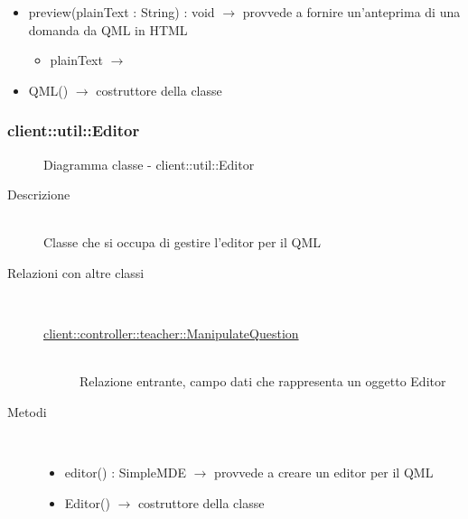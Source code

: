\begin{description}
\begin{itemize}
	\item preview(plainText : String) : void $\rightarrow$ provvede a fornire un'anteprima di una domanda da QML in HTML\begin{itemize}
		\item plainText $\rightarrow$ 
	\end{itemize}
	
	\item QML() $\rightarrow$ costruttore della classe
\end{itemize}

\end{description}

\vspace{0.5cm}
\hypertarget{client::util::Editor}{}
\subsubsection[Editor]{client::util::Editor}
\begin{figure}[H]
	\centering
	\caption{Diagramma classe - client::util::Editor}
\end{figure}\begin{description}
\item[Descrizione] \hfill \\
Classe che si occupa di gestire l'editor per il QML
\item[Relazioni con altre classi] \hfill \\
\vspace{-7mm}
\begin{description}
	\item[\hyperlink{client::controller::teacher::ManipulateQuestion}{client::controller::teacher::ManipulateQuestion}] \hfill \\
	Relazione entrante, campo dati che rappresenta un oggetto Editor
\end{description}

\item[Metodi] \hfill \\
\vspace{-7mm}
\begin{itemize}
	\item editor() : SimpleMDE $\rightarrow$ provvede a creare un editor per il QML
	\item Editor() $\rightarrow$ costruttore della classe
\end{itemize}

\end{description}

